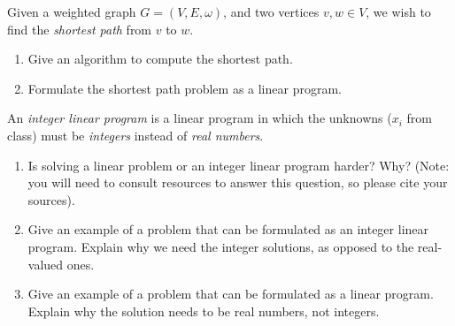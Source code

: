 \documentclass{article}
\begin{document}
\nextprob
Given a weighted graph $G=(V,E,\omega)$, and two vertices $v,w \in V$, we wish
to find the \emph{shortest path} from $v$ to $w$.

\begin{enumerate}
    \item Give an algorithm to compute the shortest path.
    \item Formulate the shortest path problem as a linear program.
\end{enumerate}

\nextprob
An \emph{integer linear program} is a linear program in which the unknowns
($x_i$ from class) must be \emph{integers} instead of \emph{real numbers}.

\begin{enumerate}
    \item Is solving a linear problem or an integer linear program harder?  Why?
        (Note: you will need to consult resources to answer this question, so
        please cite your sources).
    \item Give an example of a problem that can be formulated as an integer
        linear program.  Explain why we need the integer solutions, as opposed
        to the real-valued ones.
    \item Give an example of a problem that can be formulated as a linear
        program.  Explain why the solution needs to be real numbers, not integers.
\end{enumerate}
\end{document}
